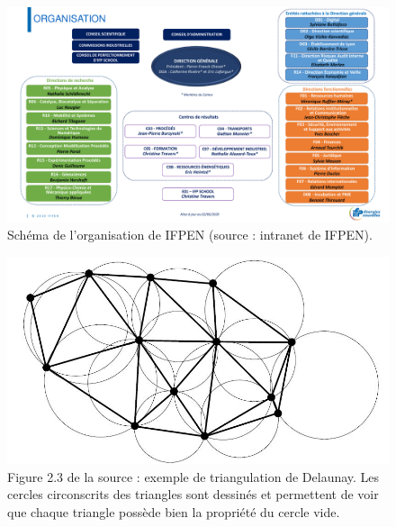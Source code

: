 \documentclass[12pt,a4paper]{report}
\begin{document}
\begin{figure}[htbp]
\begin{center}
\includegraphics[scale=0.6, angle=90]{vf-schema-organisation-ifpen-marguerite.pdf}
\caption{Schéma de l'organisation de IFPEN (source : intranet de IFPEN).}
\label{ifpen_org}
\end{center}
\end{figure}
\clearpage

\begin{figure}[t]
\begin{center}
\includegraphics[scale=0.6]{delTri.jpg}
\caption{Figure 2.3 de la source \cite{delnotes} : exemple de triangulation de Delaunay. Les cercles circonscrits des triangles sont dessinés et permettent de voir que chaque triangle possède bien la propriété du cercle vide.}
\label{delaunay}
\end{center}
\end{figure}
\end{document}
